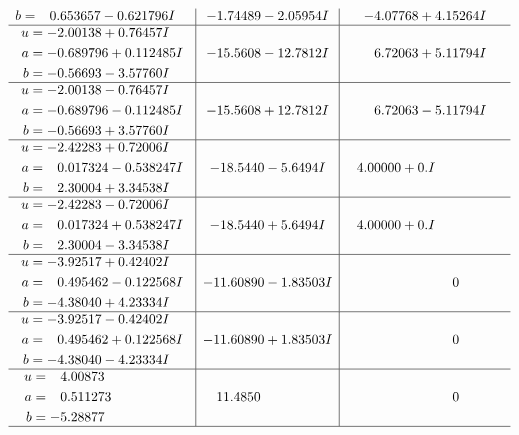 \documentclass[1p]{elsarticle_modified}
\theoremstyle{definition}
\begin{document}
$$\begin{array}{c|c|c}
\begin{aligned}
b &= \phantom{-}0.653657 - 0.621796 I\end{aligned}
 & -1.74489 - 2.05954 I & -4.07768 + 4.15264 I \\ \hline\begin{aligned}
u &= -2.00138 + 0.76457 I \\
a &= -0.689796 + 0.112485 I \\
b &= -0.56693 - 3.57760 I\end{aligned}
 & -15.5608 - 12.7812 I & \phantom{-}6.72063 + 5.11794 I \\ \hline\begin{aligned}
u &= -2.00138 - 0.76457 I \\
a &= -0.689796 - 0.112485 I \\
b &= -0.56693 + 3.57760 I\end{aligned}
 & -15.5608 + 12.7812 I & \phantom{-}6.72063 - 5.11794 I \\ \hline\begin{aligned}
u &= -2.42283 + 0.72006 I \\
a &= \phantom{-}0.017324 - 0.538247 I \\
b &= \phantom{-}2.30004 + 3.34538 I\end{aligned}
 & -18.5440 - 5.6494 I & \phantom{-}4.00000 + 0. I\phantom{ +0.000000I} \\ \hline\begin{aligned}
u &= -2.42283 - 0.72006 I \\
a &= \phantom{-}0.017324 + 0.538247 I \\
b &= \phantom{-}2.30004 - 3.34538 I\end{aligned}
 & -18.5440 + 5.6494 I & \phantom{-}4.00000 + 0. I\phantom{ +0.000000I} \\ \hline\begin{aligned}
u &= -3.92517 + 0.42402 I \\
a &= \phantom{-}0.495462 - 0.122568 I \\
b &= -4.38040 + 4.23334 I\end{aligned}
 & -11.60890 - 1.83503 I & \phantom{-0.000000 } 0 \\ \hline\begin{aligned}
u &= -3.92517 - 0.42402 I \\
a &= \phantom{-}0.495462 + 0.122568 I \\
b &= -4.38040 - 4.23334 I\end{aligned}
 & -11.60890 + 1.83503 I & \phantom{-0.000000 } 0 \\ \hline\begin{aligned}
u &= \phantom{-}4.00873\phantom{ +0.000000I} \\
a &= \phantom{-}0.511273\phantom{ +0.000000I} \\
b &= -5.28877\phantom{ +0.000000I}\end{aligned}
 & \phantom{-}11.4850\phantom{ +0.000000I} & \phantom{-0.000000 } 0\\
 \hline 
 \end{array}$$\newpage\newpage\renewcommand{\arraystretch}{1}
\end{document}
